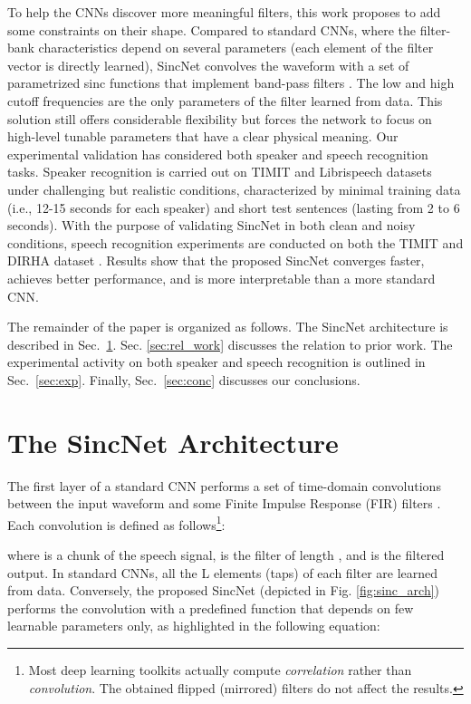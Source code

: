 \documentclass{article}
\begin{document}
To help the CNNs discover more meaningful filters, this work proposes to add some constraints on their shape. Compared to standard CNNs, where the filter-bank characteristics depend on several parameters (each element of the filter vector is directly learned), SincNet convolves the waveform with a set of parametrized sinc functions that implement band-pass filters \cite{SincNet}. The low and high cutoff frequencies are the only parameters of the filter learned from data. This solution still offers considerable flexibility but forces the network to focus on high-level tunable parameters that have a clear physical meaning. Our experimental validation has considered both speaker and speech recognition tasks. Speaker recognition is carried out on TIMIT \cite{timit} and Librispeech \cite{librispeech} datasets under challenging but realistic conditions, characterized by minimal training data (i.e., 12-15 seconds for each speaker) and short test sentences (lasting from 2 to 6 seconds). With the purpose of validating SincNet in both clean and noisy conditions, speech recognition experiments are conducted on both the TIMIT and DIRHA dataset \cite{dirha_asru,rav_is16}. 
Results show that the proposed SincNet converges faster, achieves better performance, and is more interpretable than a more standard CNN.

The remainder of the paper is organized as follows. The SincNet architecture is described in Sec.~\ref{sec:sinc}. Sec. \ref{sec:rel_work} discusses the relation to prior work. The experimental activity on both speaker and speech recognition is outlined in  Sec.~\ref{sec:exp}. Finally, Sec.~\ref{sec:conc} discusses our conclusions.


\section{The SincNet Architecture} \label{sec:sinc}
The first layer of a standard CNN performs a set of time-domain convolutions between the input waveform and some Finite Impulse Response (FIR) filters \cite{rabiner11}. Each convolution is defined as follows\footnote{Most deep learning toolkits actually compute \textit{correlation} rather than \textit{convolution}. The obtained flipped (mirrored) filters do not affect the results.}:

where  is a chunk of the speech signal,  is the filter of length , and  is the filtered output. In standard CNNs, all the L elements (taps) of each filter are learned from data. Conversely, the proposed SincNet (depicted in Fig. \ref{fig:sinc_arch}) performs the convolution with a predefined function  that depends on few learnable parameters  only, as highlighted in the following equation:
\end{document}
